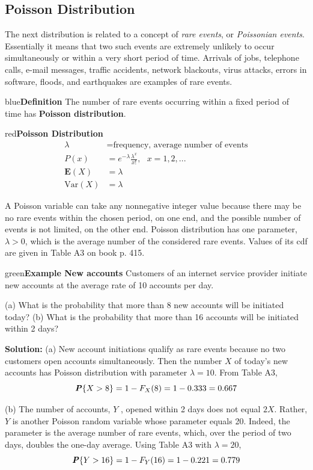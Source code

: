 \documentclass{article}
\newenvironment{example}[1]{\begin{mybox}{green}{\textbf{Example #1}}}{\end{mybox}}
\newenvironment{definition}[1]{\begin{mybox}{blue}{\textbf{Definition #1}}}{\end{mybox}}
\newenvironment{formula}[1]{\begin{mybox}{red}{\textbf{#1}}}{\end{mybox}}
\newcommand{\prob}[1]{\textbf{\textit{P}}\{#1\}}
\begin{document}
\subsection{Poisson Distribution}

The next distribution is related to a concept of \textit{rare events}, or \textit{Poissonian events}. Essentially it means that two such events are extremely unlikely to occur simultaneously or within a very short period of time. Arrivals of jobs, telephone calls, e-mail messages, traffic accidents, network blackouts, virus attacks, errors in software, floods, and earthquakes are examples of rare events.
\begin{definition}{}
The number of rare events occurring within a fixed period of time has \textbf{Poisson distribution}.
\end{definition}

\begin{formula}{Poisson Distribution}
\begin{align*}
    \lambda &= \text{frequency, average number of events}\\
    P(x) &= e^{-\lambda} \frac{\lambda^x}{x!},\ \ \ x = 1, 2, ...\\
    \mathbf{E}(X) &= \lambda\\
    \text{Var}(X) &= \lambda
\end{align*}
\end{formula}

A Poisson variable can take any nonnegative integer value because there may be no rare events within the chosen period, on one end, and the possible number of events is not limited, on the other end. Poisson distribution has one parameter, $\lambda > 0$, which is the
average number of the considered rare events. Values of its cdf are given in Table A3 on book p. 415.

\begin{example}{New accounts}
Customers of an internet service provider initiate new accounts at the average rate of 10 accounts per day.

(a) What is the probability that more than 8 new accounts will be initiated today?
(b) What is the probability that more than 16 accounts will be initiated within 2 days?

\textbf{Solution:}
(a) New account initiations qualify as rare events because no two customers open accounts simultaneously. Then the number $X$ of today’s new accounts has Poisson distribution with parameter $\lambda = 10$. From Table A3,
\begin{equation*}
    \prob{X > 8} = 1 - F_X (8) = 1 - 0.333 = 0.667
\end{equation*}

(b) The number of accounts, $Y$ , opened within 2 days does not equal $2X$. Rather, $Y$ is another Poisson random variable whose parameter equals 20. Indeed, the parameter is the average number of rare events, which, over the period of two days, doubles the one-day average. Using Table A3 with $\lambda = 20$,
\begin{equation*}
    \prob{Y > 16} = 1 - F_Y (16) = 1 - 0.221 = 0.779
\end{equation*}
\end{example}
\end{document}
